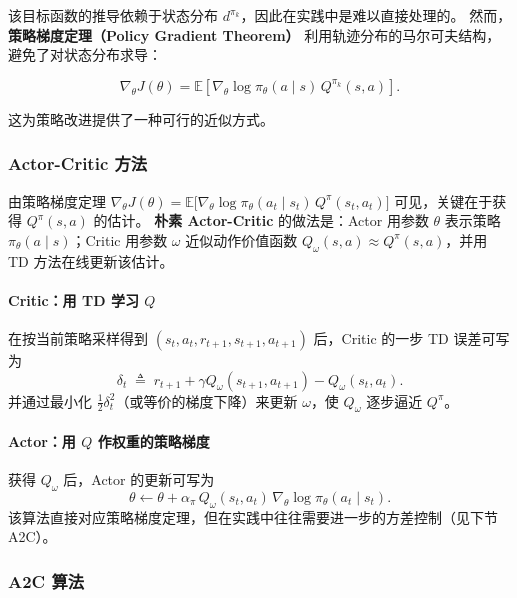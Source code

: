 \documentclass[oneside]{ctexbook}
\begin{document}
该目标函数的推导依赖于状态分布 $d^{\pi_k}$，因此在实践中是难以直接处理的。
然而，\textbf{策略梯度定理（Policy Gradient Theorem）} 利用轨迹分布的马尔可夫结构，避免了对状态分布求导：

\begin{equation}
\nabla_\theta J(\theta)
=
\mathbb E
\left[
\nabla_\theta \log \pi_\theta(a\mid s)
\,
Q^{\pi_k}(s,a)
\right].
\end{equation}

这为策略改进提供了一种可行的近似方式。

\subsubsection{Actor-Critic 方法}

由策略梯度定理
\(
\nabla_\theta J(\theta)=\mathbb E\bigl[\nabla_\theta\log\pi_\theta(a_t\mid s_t)\,Q^{\pi}(s_t,a_t)\bigr]
\)
可见，关键在于获得 $Q^{\pi}(s,a)$ 的估计。
\textbf{朴素 Actor-Critic} 的做法是：Actor 用参数 $\theta$ 表示策略 $\pi_\theta(a\mid s)$；Critic 用参数 $\omega$ 近似动作价值函数 $Q_\omega(s,a)\approx Q^{\pi}(s,a)$，并用 TD 方法在线更新该估计。

\paragraph{Critic：用 TD 学习 $Q$}
在按当前策略采样得到 $(s_t,a_t,r_{t+1},s_{t+1},a_{t+1})$ 后，Critic 的一步 TD 误差可写为
\begin{equation}
\delta_t \;\triangleq\; r_{t+1}+\gamma Q_\omega(s_{t+1},a_{t+1})-Q_\omega(s_t,a_t).
\end{equation}
并通过最小化 $\frac{1}{2}\delta_t^2$（或等价的梯度下降）来更新 $\omega$，使 $Q_\omega$ 逐步逼近 $Q^{\pi}$。

\paragraph{Actor：用 $Q$ 作权重的策略梯度}
获得 $Q_\omega$ 后，Actor 的更新可写为
\begin{equation}
\theta \leftarrow \theta + \alpha_\pi\, Q_\omega(s_t,a_t)\,\nabla_\theta\log\pi_\theta(a_t\mid s_t).
\end{equation}
该算法直接对应策略梯度定理，但在实践中往往需要进一步的方差控制（见下节 A2C）。

\subsubsection{A2C 算法}
\end{document}
